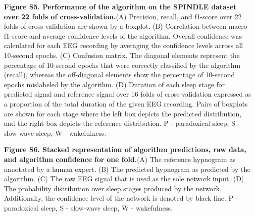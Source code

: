 \documentclass[pdflatex,sn-mathphys-num]{sn-jnl}%
\theoremstyle{thmstyleone}%
\theoremstyle{thmstyletwo}%
\theoremstyle{thmstylethree}%
\begin{document}
\noindent
\textbf{Figure S5. Performance of the algorithm on the SPINDLE dataset over 22 folds of cross-validation.}\quad (A) Precision, recall, and f1-score over 22 folds of cross-validation are shown by a boxplot. (B) Correlation between macro f1-score and average confidence levels of the algorithm. Overall confidence was calculated for each EEG recording by averaging the confidence levels across all 10-second epochs. (C) Confusion matrix. The diagonal elements represent the percentage of 10-second epochs that were correctly classified by the algorithm (recall), whereas the off-diagonal elements show the percentage of 10-second epochs mislabeled by the algorithm. (D) Duration of each sleep stage for predicted signal and reference signal over 16 folds of cross-validation expressed as a proportion of the total duration of the given EEG recording. Pairs of boxplots are shown for each stage where the left box depicts the predicted distribution, and the right box depicts the reference distribution. P - paradoxical sleep, S - slow-wave sleep, W - wakefulness.
\vspace{12pt} %

\noindent
\textbf{Figure S6. Stacked representation of algorithm predictions, raw data, and algorithm confidence for one fold.}\quad (A) The reference hypnogram as annotated by a human expert. (B) The predicted hypnogram as predicted by the algorithm. (C) The raw EEG signal that is used as the sole network input. (D) The probability distribution over sleep stages produced by the network. Additionally, the confidence level of the network is denoted by black line. P - paradoxical sleep, S - slow-wave sleep, W - wakefulness.
\vspace{12pt} %

\end{document}
